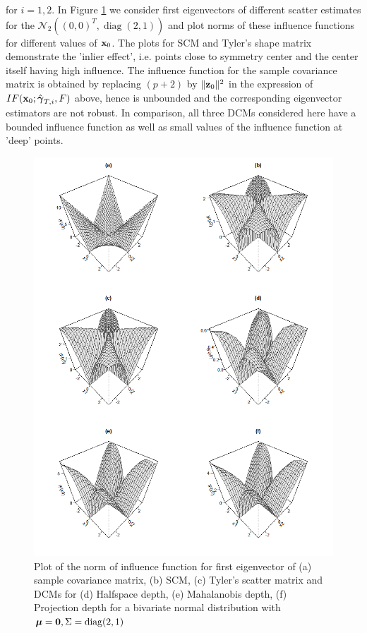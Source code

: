 \documentclass[fleqn,11pt]{article}
\DeclareMathOperator*{\diag}{diag}
\begin{document}
for $i = 1,2$. In Figure \ref{fig:IFnorm} we consider first eigenvectors of different scatter estimates for the $\mathcal{N}_2((0,0)^T, \diag(2,1))$ and plot norms of these influence functions for different values of ${\bf{x}}_0$. The plots for SCM and Tyler's shape matrix demonstrate the 'inlier effect', i.e. points close to symmetry center and the center itself having high influence. The influence function for the sample covariance matrix is obtained by replacing $(p+2)$ by $\| {\bf{z}}_0 \|^2$ in the expression of $IF({\bf{x}}_0; \hat {{\boldsymbol{\gamma}}}_{T,i}, F)$ above, hence is unbounded and the corresponding eigenvector estimators are not robust. In comparison, all three DCMs considered here have a bounded influence function as well as small values of the influence function at 'deep' points.

\begin{figure}[]
	\centering
		\includegraphics[width=12cm]{../Codes/IFnorm.png}
	\caption{Plot of the norm of influence function for first eigenvector of (a) sample covariance matrix, (b) SCM, (c) Tyler's scatter matrix and DCMs for (d) Halfspace depth, (e) Mahalanobis depth, (f) Projection depth for a bivariate normal distribution with $\bfmu = {\bf 0}, \Sigma = \diag(2,1)$}
	\label{fig:IFnorm}
\end{figure}
\end{document}
